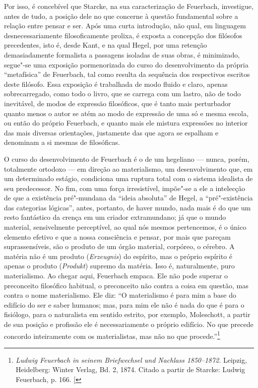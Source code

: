 Por isso, é concebível que Starcke, na sua caracterização
de Feuerbach,
investigue, antes de tudo, a posição dele no que concerne à questão
fundamental sobre a relação entre pensar e ser. Após uma curta
introdução, não qual, em linguagem desnecessariamente filosoficamente
prolixa, é exposta a concepção dos filósofos precedentes, isto é,
desde Kant,
e na qual
Hegel,
por uma retenção demasiadamente formalista a passagens isoladas de suas
obras, é minimizado, segue"-se uma exposição pormenorizada do curso do
desenvolvimento da própria ``metafísica''
de Feuerbach,
tal como resulta da sequência dos respectivos escritos deste filósofo.
Essa exposição é trabalhada de modo fluido e claro, apenas
sobrecarregado, como todo o livro, que se carrega com um lastro, não de
todo inevitável, de modos de expressão filosóficos, que é tanto mais
perturbador quanto menos o autor se atém ao modo de expressão de uma só
e mesma escola, ou então do
próprio Feuerbach,
e quanto mais ele mistura expressões no interior das mais diversas
orientações, justamente das que agora se espalham e denominam a si
mesmas de filosóficas.

O curso do desenvolvimento
de Feuerbach é
o de um hegeliano --- nunca, porém, totalmente ortodoxo --- em direção ao
materialismo, um desenvolvimento que, em um determinado estágio,
condiciona uma ruptura total com o sistema idealista de seu predecessor.
No fim, com uma força irresistível, impõe"-se a ele a intelecção de que a
existência pré"-mundana da ``ideia absoluta''
de Hegel,
a ``pré"-existência das categorias lógicas'', antes, portanto, de haver
mundo, nada mais é do que um resto fantástico da crença em um criador
extramundano; já que o mundo material, sensivelmente perceptível, ao
qual nós mesmos pertencemos, é o único elemento efetivo e que a nossa
consciência e pensar, por mais que pareçam suprassensíveis, são o
produto de um órgão material, corpóreo, o cérebro. A matéria não é um
produto (\emph{Erzeugnis}) do espírito, mas o próprio espírito é apenas
o produto (\emph{Produkt}) supremo da matéria. Isso é, naturalmente,
puro materialismo. Ao chegar aqui, Feuerbach empaca. Ele não pode
superar o preconceito filosófico habitual, o preconceito não contra a
coisa em questão, mas contra o nome materialismo. Ele diz: ``O
materialismo é para mim a base do edifício do ser e saber humanos; mas,
para mim ele não é nada do que é para o fisiólogo, para o naturalista em
sentido estrito, por exemplo,
Moleschott,
a partir de sua posição e profissão ele é necessariamente o próprio
edifício. No que precede concordo inteiramente com os materialistas, mas
não no que procede.''\footnote{\emph{Ludwig Feuerbach in
  seinem Briefwechsel und Nachlass 1850--1872.} Leipzig, Heidelberg:
  Winter Verlag, Bd. 2, 1874. Citado a partir de Starcke: Ludwig
  Feuerbach, p. 166. {[}\versal{N.\,T.}{]}}

